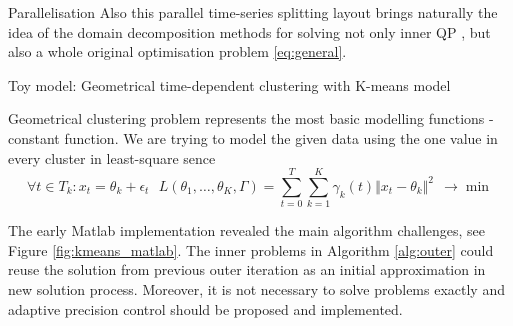 \documentclass[final,hyperref={pdfpagelabels=false}]{beamer}
\begin{document}
\begin{frame}[t]
\begin{columns}[t]
\begin{column}{.48\textwidth}
\begin{block}{Parallelisation}
Also this parallel time-series splitting layout brings naturally the idea of the domain decomposition methods for solving not only inner QP \label{eq:qp}, 
but also a whole original optimisation problem \eqref{eq:general}.

\end{block}

\begin{block}{Toy model: Geometrical time-dependent clustering with K-means model} 

Geometrical clustering problem represents the most basic modelling functions - constant function. 
We are trying to model the given data using the one value in every cluster in least-square sence
\begin{displaymath}
 \forall t \in T_k: x_t = \theta_k + \epsilon_t ~~~ 
 L(\theta_1, \dots, \theta_K, \Gamma) 
 = \sum\limits_{t = 0}^{T} \sum\limits_{k = 1}^{K} \gamma_k(t) \Vert x_t - \theta_k \Vert^2 ~~ \rightarrow \min 
\end{displaymath}

The early Matlab implementation revealed the main algorithm challenges, see Figure \ref{fig:kmeans_matlab}. The inner problems in Algorithm \ref{alg:outer} could reuse the solution from previous outer iteration
as an initial approximation in new solution process. Moreover, it is not necessary to solve problems exactly and adaptive precision control should be proposed and implemented.


\end{block}
\end{column}
\end{columns}
\end{frame}
\end{document}

